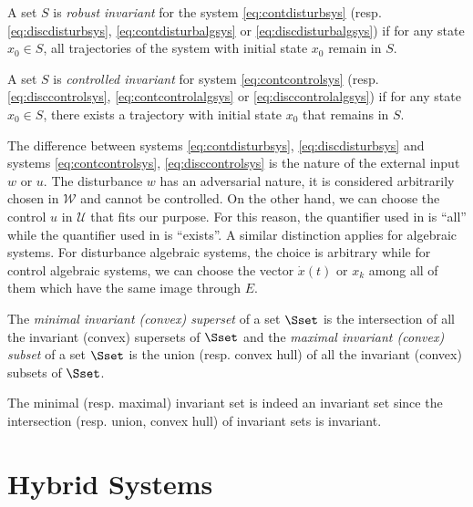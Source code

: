 \documentclass[11pt,twoside,a4paper,openright]{uclouvain-thesis}
\newcommand{\implementations}[1]{}
\begin{document}
\begin{mydef}
  \label{def:robustinv}
  A set $S$ is \emph{robust invariant} for the system \eqref{eq:contdisturbsys} (resp. \eqref{eq:discdisturbsys}, \eqref{eq:contdisturbalgsys} or \eqref{eq:discdisturbalgsys})
  if for any state $x_0 \in S$, all trajectories of the system with initial state $x_0$ remain in $S$.
\end{mydef}

\begin{mydef}
  \label{def:controlinv}
  A set $S$ is \emph{controlled invariant} for system \eqref{eq:contcontrolsys} (resp. \eqref{eq:disccontrolsys}, \eqref{eq:contcontrolalgsys} or \eqref{eq:disccontrolalgsys})
  if for any state $x_0 \in S$, there exists a trajectory with initial state $x_0$ that remains in $S$.
\end{mydef}

\begin{myrem}
  \label{rem:disturbvscontrol}
  The difference between systems \eqref{eq:contdisturbsys}, \eqref{eq:discdisturbsys}
  and systems \eqref{eq:contcontrolsys}, \eqref{eq:disccontrolsys}
  is the nature of the external input $w$ or $u$.
  The disturbance $w$ has an adversarial nature, it is considered arbitrarily chosen in $\mathcal{W}$ and cannot be controlled.
  On the other hand, we can choose the control $u$ in $\mathcal{U}$ that fits our purpose.
  For this reason, the quantifier used in  is ``all'' while the quantifier
  used in  is ``exists''.
  A similar distinction applies for algebraic systems.
  For disturbance algebraic systems, the choice is arbitrary while for control algebraic systems,
  we can choose the vector $\dot{x}(t)$ or $x_{k}$ among all of them which have the same image through $E$.
\end{myrem}

The \emph{minimal invariant (convex) superset} of a set $\Sset$ is the intersection of all the invariant (convex) supersets of $\Sset$
and
the \emph{maximal invariant (convex) subset} of a set $\Sset$ is the union (resp. convex hull) of all the invariant (convex) subsets of $\Sset$.

The minimal (resp. maximal) invariant set is indeed an invariant set since the intersection (resp. union, convex hull) of invariant sets is invariant.


\implementations{\jlpkg{MathematicalSystems}.}

\section{Hybrid Systems}
\label{sec:hybrid}
\end{document}
